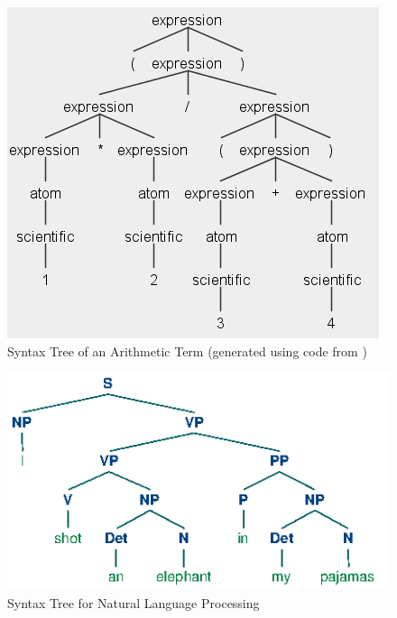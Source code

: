 \documentclass[a4paper,12pt]{report}
\begin{document}
\begin{figure}[p]
	\centering
	\includegraphics[scale=0.75]{images/arithmetic_syntax_tree}
	\caption{Syntax Tree of an Arithmetic Term (generated using code from \protect\cite{Everett2019})}
	\label{arithmetic_syntax_tree}
\end{figure}

\begin{figure}[p]
	\centering
	\includegraphics[scale=0.75]{images/nlp_tree}
	\caption{Syntax Tree for Natural Language Processing \protect\cite{Bird2009}}
	\label{nlp_tree}
\end{figure}
\end{document}
